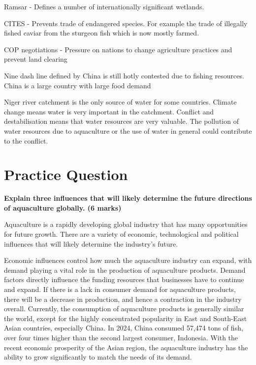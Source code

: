 				Ramsar - Defines a number of internationally significant wetlands.

				CITES - Prevents trade of endangered species. For example the trade of illegally fished caviar from the sturgeon fish which is now mostly farmed.

				COP negotiations - Pressure on nations to change agriculture practices and prevent land clearing

				Nine dash line defined by China is still hotly contested due to fishing resources. China is a large country with large food demand

				Niger river catchment is the only source of water for some countries. Climate change means water is very important in the catchment. Conflict and destabilisation means that water resources are very valuable. The pollution of water resources due to aquaculture or the use of water in general could contribute to the conflict.

\newpage
\section{Practice Question}
	\textbf{Explain three influences that will likely determine the future directions of aquaculture globally. (6 marks)}

	Aquaculture is a rapidly developing global industry that has many opportunities for future growth. There are a variety of economic, technological and political influences that will likely determine the industry's future.

	Economic influences control how much the aquaculture industry can expand, with demand playing a vital role in the production of aquaculture products. Demand factors directly influence the funding resources that businesses have to continue and expand. If there is a lack in consumer demand for aquaculture products, there will be a decrease in production, and hence a contraction in the industry overall. Currently, the consumption of aquaculture products is generally similar the world, except for the highly concentrated popularity in East and South-East Asian countries, especially China. In 2024, China consumed 57,474 tons of fish, over four times higher than the second largest consumer, Indonesia. With the recent economic prosperity of the Asian region, the aquaculture industry has the ability to grow significantly to match the needs of its demand.

